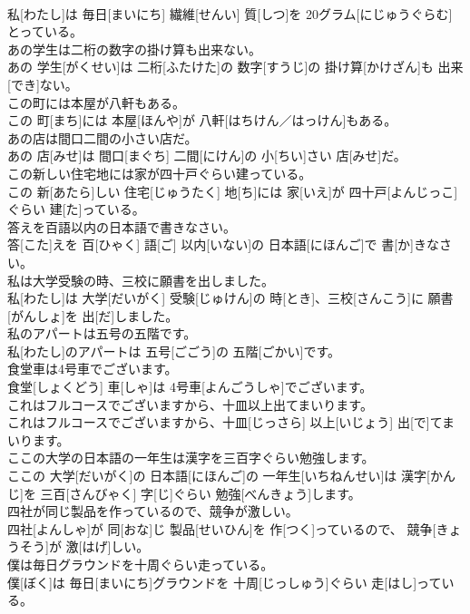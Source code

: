 \documentclass[8pt]{extreport}
\begin{document}
\begin{CJK}{UTF8}{min}
\\	私[わたし]は 毎日[まいにち] 繊維[せんい] 質[しつ]を 20グラム[にじゅうぐらむ]とっている。
\\	あの学生は二桁の数字の掛け算も出来ない。	
\\	あの 学生[がくせい]は 二桁[ふたけた]の 数字[すうじ]の 掛け算[かけざん]も 出来[でき]ない。
\\	この町には本屋が八軒もある。	
\\	この 町[まち]には 本屋[ほんや]が 八軒[はちけん／はっけん]もある。
\\	あの店は間口二間の小さい店だ。	
\\	あの 店[みせ]は 間口[まぐち] 二間[にけん]の 小[ちい]さい 店[みせ]だ。
\\	この新しい住宅地には家が四十戸ぐらい建っている。	
\\	この 新[あたら]しい 住宅[じゅうたく] 地[ち]には 家[いえ]が 四十戸[よんじっこ]ぐらい 建[た]っている。
\\	答えを百語以内の日本語で書きなさい。	
\\	答[こた]えを 百[ひゃく] 語[ご] 以内[いない]の 日本語[にほんご]で 書[か]きなさい。
\\	私は大学受験の時、三校に願書を出しました。	
\\	私[わたし]は 大学[だいがく] 受験[じゅけん]の 時[とき]、三校[さんこう]に 願書[がんしょ]を 出[だ]しました。
\\	私のアパートは五号の五階です。	
\\	私[わたし]のアパートは 五号[ごごう]の 五階[ごかい]です。
\\	食堂車は4号車でございます。	
\\	食堂[しょくどう] 車[しゃ]は 4号車[よんごうしゃ]でございます。
\\	これはフルコースでございますから、十皿以上出てまいります。	
\\	これはフルコースでございますから、十皿[じっさら] 以上[いじょう] 出[で]てまいります。
\\	ここの大学の日本語の一年生は漢字を三百字ぐらい勉強します。	
\\	ここの 大学[だいがく]の 日本語[にほんご]の 一年生[いちねんせい]は 漢字[かんじ]を 三百[さんびゃく] 字[じ]ぐらい 勉強[べんきょう]します。
\\	四社が同じ製品を作っているので、競争が激しい。	
\\	四社[よんしゃ]が 同[おな]じ 製品[せいひん]を 作[つく]っているので、 競争[きょうそう]が 激[はげ]しい。
\\	僕は毎日グラウンドを十周ぐらい走っている。	
\\	僕[ぼく]は 毎日[まいにち]グラウンドを 十周[じっしゅう]ぐらい 走[はし]っている。

\end{CJK}
\end{document}
